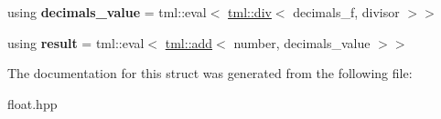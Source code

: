 \begin{DoxyCompactItemize}
\item 
\hypertarget{structtml_1_1floating_1_1impl_1_1decimal_ab870e1dbdd306bdb31365395ff435c97}{using {\bfseries decimals\+\_\+value} = tml\+::eval$<$ \hyperlink{structtml_1_1div}{tml\+::div}$<$ decimals\+\_\+f, divisor $>$$>$}\label{structtml_1_1floating_1_1impl_1_1decimal_ab870e1dbdd306bdb31365395ff435c97}

\item 
\hypertarget{structtml_1_1floating_1_1impl_1_1decimal_a19fcb26551cba54b91351e003259e19f}{using {\bfseries result} = tml\+::eval$<$ \hyperlink{structtml_1_1add}{tml\+::add}$<$ number, decimals\+\_\+value $>$$>$}\label{structtml_1_1floating_1_1impl_1_1decimal_a19fcb26551cba54b91351e003259e19f}

\end{DoxyCompactItemize}


The documentation for this struct was generated from the following file\+:\begin{DoxyCompactItemize}
\item 
float.\+hpp\end{DoxyCompactItemize}
